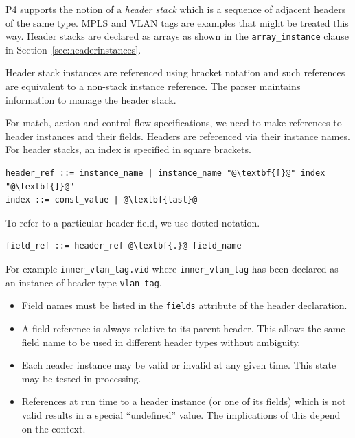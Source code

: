 \documentclass[12pt]{article}
\begin{document}

P4 supports the notion of a \textit{header stack} which is a sequence
of adjacent headers of the same type. MPLS and VLAN tags are examples
that might be treated this way.  Header stacks are declared as arrays
as shown in the \texttt{array_instance} clause in
Section~\ref{sec:headerinstances}.

Header stack instances are referenced using bracket notation and such
references are equivalent to a non-stack instance reference.  The
parser maintains information to manage the header stack.


For match, action and control flow specifications, we need to make
references to header instances and their fields. Headers are
referenced via their instance names.  For header stacks, an index is
specified in square brackets.

\begin{lstlisting}[frame=single,backgroundcolor=\color{bnfgreen},escapechar=\@]
header_ref ::= instance_name | instance_name "@\textbf{[}@" index "@\textbf{]}@"
index ::= const_value | @\textbf{last}@
\end{lstlisting}

To refer to a particular header field, we use dotted notation.

\begin{lstlisting}[frame=single,backgroundcolor=\color{bnfgreen},escapechar=\@]
field_ref ::= header_ref @\textbf{.}@ field_name
\end{lstlisting}

For example \texttt{inner_vlan_tag.vid} where
\texttt{inner_vlan_tag} has been declared as an instance of header
type \texttt{vlan_tag}.

\begin{itemize}
\item
Field names must be listed in the \texttt{fields} attribute of the
header declaration.
\item
A field reference is always relative to its parent header.  This allows the 
same field name to be used in different header types without ambiguity.
\item
Each header instance may be valid or invalid at any given time. This state 
may be tested in \matchaction processing.
\item
References at run time to a header instance (or one of its fields) which is 
not valid results in a special ``undefined'' value.  The implications of this 
depend on the context.
\end{itemize}
    
\end{document}
